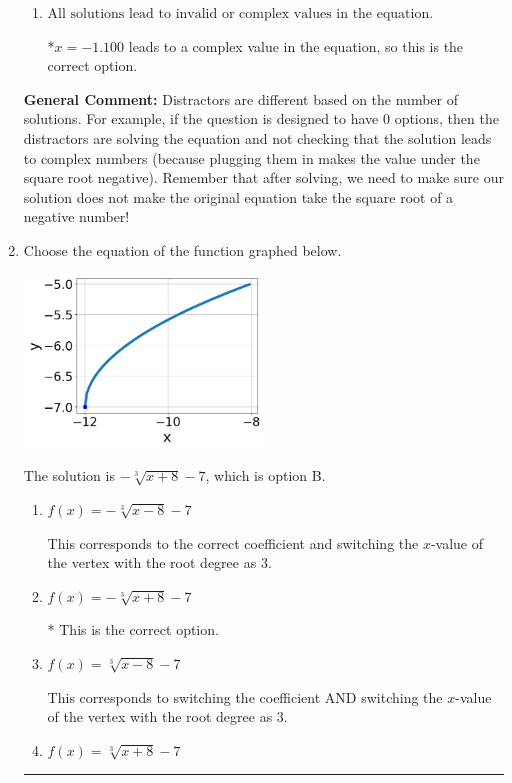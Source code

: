 \documentclass{extbook}[14pt]
\newcommand{\litem}[1]{\item #1

\rule{\textwidth}{0.4pt}}
\begin{document}
\begin{enumerate}
{\begin{enumerate}[label=\Alph*.]
$x = 0.300$, which corresponds to squaring each square root separately and assigning the negative to the third term.
\item \( \text{All solutions lead to invalid or complex values in the equation.} \)

*$x = -1.100$ leads to a complex value in the equation, so this is the correct option.
\end{enumerate}

\textbf{General Comment:} Distractors are different based on the number of solutions. For example, if the question is designed to have 0 options, then the distractors are solving the equation and not checking that the solution leads to complex numbers (because plugging them in makes the value under the square root negative). Remember that after solving, we need to make sure our solution does not make the original equation take the square root of a negative number!
}
\litem{
Choose the equation of the function graphed below.

\begin{center}
    \includegraphics[width=0.5\textwidth]{../Figures/radicalGraphToEquationCopyA.png}
\end{center}


The solution is \( - \sqrt[3]{x + 8} - 7 \), which is option B.\begin{enumerate}[label=\Alph*.]
\item \( f(x) = - \sqrt[3]{x - 8} - 7 \)

This corresponds to the correct coefficient and switching the $x$-value of the vertex with the root degree as $3$.
\item \( f(x) = - \sqrt[3]{x + 8} - 7 \)

* This is the correct option.
\item \( f(x) = \sqrt[3]{x - 8} - 7 \)

This corresponds to switching the coefficient AND switching the $x$-value of the vertex with the root degree as $3$.
\item \( f(x) = \sqrt[3]{x + 8} - 7 \)


\end{enumerate}}
\end{enumerate}
\end{document}
